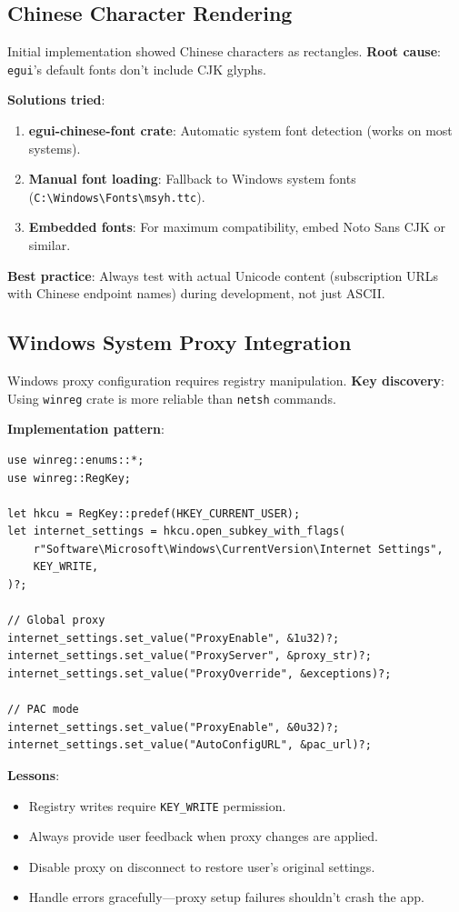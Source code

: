 \subsection{Chinese Character Rendering}

Initial implementation showed Chinese characters as rectangles. \textbf{Root cause}: \texttt{egui}'s default fonts don't include CJK glyphs.

\textbf{Solutions tried}:
\begin{enumerate}
    \item \textbf{egui-chinese-font crate}: Automatic system font detection (works on most systems).
    \item \textbf{Manual font loading}: Fallback to Windows system fonts (\texttt{C:\textbackslash Windows\textbackslash Fonts\textbackslash msyh.ttc}).
    \item \textbf{Embedded fonts}: For maximum compatibility, embed Noto Sans CJK or similar.
\end{enumerate}

\textbf{Best practice}: Always test with actual Unicode content (subscription URLs with Chinese endpoint names) during development, not just ASCII.

\subsection{Windows System Proxy Integration}

Windows proxy configuration requires registry manipulation. \textbf{Key discovery}: Using \texttt{winreg} crate is more reliable than \texttt{netsh} commands.

\textbf{Implementation pattern}:
\begin{verbatim}
use winreg::enums::*;
use winreg::RegKey;

let hkcu = RegKey::predef(HKEY_CURRENT_USER);
let internet_settings = hkcu.open_subkey_with_flags(
    r"Software\Microsoft\Windows\CurrentVersion\Internet Settings",
    KEY_WRITE,
)?;

// Global proxy
internet_settings.set_value("ProxyEnable", &1u32)?;
internet_settings.set_value("ProxyServer", &proxy_str)?;
internet_settings.set_value("ProxyOverride", &exceptions)?;

// PAC mode
internet_settings.set_value("ProxyEnable", &0u32)?;
internet_settings.set_value("AutoConfigURL", &pac_url)?;
\end{verbatim}

\textbf{Lessons}:
\begin{itemize}
    \item Registry writes require \texttt{KEY\_WRITE} permission.
    \item Always provide user feedback when proxy changes are applied.
    \item Disable proxy on disconnect to restore user's original settings.
    \item Handle errors gracefully—proxy setup failures shouldn't crash the app.
\end{itemize}

